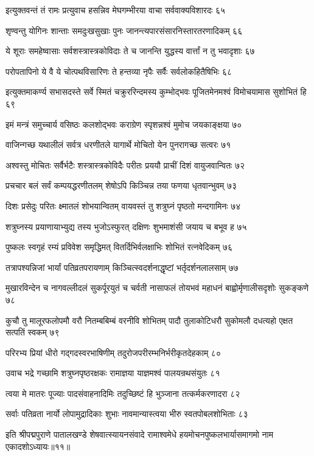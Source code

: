 इत्युक्तवन्तं तं रामः प्रत्युवाच हसन्निव
मेघगम्भीरया वाचा सर्ववाक्यविशारदः ६५

शृण्वन्तु योगिनः शान्ताः समदुःखसुखाः पुनः
जानन्त्यपारसंसारनिस्तारतरणादिकम् ६६

ये शूराः समहेष्वासाः सर्वशस्त्रास्त्रकोविदाः
ते च जानन्ति युद्धस्य वार्त्तां न तु भवादृशाः ६७

परोपतापिनो ये वै ये चोत्पथविसारिणः
ते हन्तव्या नृपैः सर्वैः सर्वलोकहितैषिभिः ६८

इत्युक्तमाकर्ण्य सभासदस्ते सर्वे स्मितं चक्रुररिन्दमस्य
कुम्भोद्भवः पूजितमेनमश्वं विमोचयामास सुशोभितं हि ६९

इमं मन्त्रं समुच्चार्य वसिष्ठः कलशोद्भवः
कराग्रेण स्पृशन्नश्वं मुमोच जयकाङ्क्षया ७०

वाजिन्गच्छ यथालीलं सर्वत्र धरणीतले
यागार्थे मोचितो येन पुनरागच्छ सत्वरः ७१

अश्वस्तु मोचितः सर्वैर्भटैः शस्त्रास्त्रकोविदैः
परीतः प्रययौ प्राचीं दिशं वायुजवान्वितः ७२

प्रचचार बलं सर्वं कम्पयद्धरणीतलम्
शेषोऽपि किञ्चिन्न तया फणया धृतवान्भुवम् ७३

दिशः प्रसेदुः परितः क्ष्मातलं शोभयान्वितम्
वायवस्तं तु शत्रुघ्नं पृष्ठतो मन्दगामिनः ७४

शत्रुघ्नस्य प्रयाणायाभ्युद्य तस्य भुजोऽस्फुरत्
दक्षिणः शुभमाशंसी जयाय च बभूव ह ७५

पुष्कलः स्वगृहं रम्यं प्रविवेश समृद्धिमत्
वितर्दिभिर्वलक्षाभिः शोभितं रत्नवेदिकम् ७६

तत्रापश्यन्निजां भार्यां पतिव्रतपरायणाम्
किञ्चित्स्वदर्शनाद्धृष्टां भर्तृदर्शनलालसाम् ७७

मुखारविन्देन च नागवल्लीदलं सुकर्पूरयुतं च चर्वती
नासाफलं तोयभवं महाधनं बाह्वोर्मृणालीसदृशोः सुकङ्कणे ७८

कुचौ तु मालूरफलोपमौ वरौ नितम्बबिम्बं वरनीवि शोभितम्
पादौ तुलाकोटिधरौ सुकोमलौ दधत्यहो एक्षत सत्पतिं स्वकम् ७९

परिरभ्य प्रियां धीरो गद्गदस्वरभाषिणीम्
तदुरोजपरीरम्भनिर्भरीकृतदेहकाम् ८०

उवाच भद्रे गच्छामि शत्रुघ्नपृष्ठरक्षकः
रामाज्ञया याज्ञमश्वं पालयन्रथसंयुतः ८१

त्वया मे मातरः पूज्याः पादसंवाहनादिमिः
तदुच्छिष्टं हि भुञ्जाना तत्कर्मकरणादरा ८२

सर्वाः पतिव्रता नार्यो लोपामुद्रादिकाः शुभाः
नावमान्यास्त्वया भीरु स्वतपोबलशोभिताः ८३

इति श्रीपद्मपुराणे पातालखण्डे शेषवात्स्यायनसंवादे रामाश्वमेधे हयमोचनपुष्कलभार्यासमागमो नाम एकादशोऽध्यायः॥११॥



